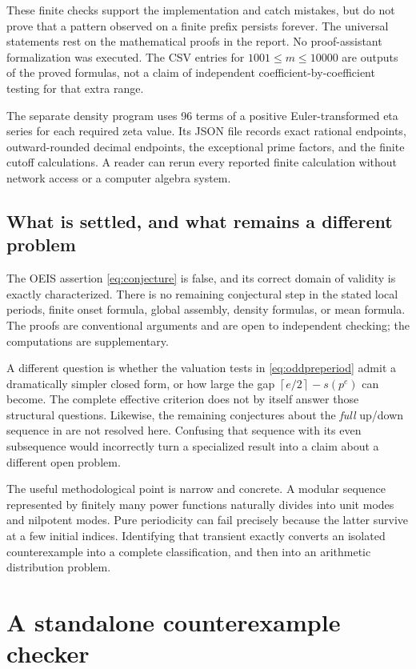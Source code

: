 \documentclass[11pt,a4paper]{article}
\numberwithin{equation}{section}
\theoremstyle{definition}
\newcommand{\ceil}[1]{\left\lceil #1\right\rceil}
\begin{document}
These finite checks support the implementation and catch mistakes, but
do not prove that a pattern observed on a finite prefix persists forever.
The universal statements rest on the mathematical proofs in the report.
No proof-assistant formalization was executed. The CSV entries for
$1001\le m\le10000$ are outputs of the proved formulas, not a claim of
independent coefficient-by-coefficient testing for that extra range.

The separate density program uses 96 terms of a positive Euler-transformed
eta series for each required zeta value. Its JSON file records exact
rational endpoints, outward-rounded decimal endpoints, the exceptional
prime factors, and the finite cutoff calculations. A reader can rerun
every reported finite calculation without network access or a computer
algebra system.

\subsection{What is settled, and what remains a different problem}

The OEIS assertion \eqref{eq:conjecture} is false, and its correct domain
of validity is exactly characterized. There is no remaining conjectural
step in the stated local periods, finite onset formula, global assembly,
density formulas, or mean formula. The proofs are conventional arguments
and are open to independent checking; the computations are supplementary.

A different question is whether the valuation tests in
\eqref{eq:oddpreperiod} admit a dramatically simpler closed form, or how
large the gap $\ceil{e/2}-s(p^e)$ can become. The complete effective
criterion does not by itself answer those structural questions.
Likewise, the remaining conjectures about the \emph{full} up/down
sequence in \cite{gulec} are not resolved here. Confusing that sequence
with its even subsequence would incorrectly turn a specialized result
into a claim about a different open problem.

The useful methodological point is narrow and concrete. A modular
sequence represented by finitely many power functions naturally divides
into unit modes and nilpotent modes. Pure periodicity can fail precisely
because the latter survive at a few initial indices. Identifying that
transient exactly converts an isolated counterexample into a complete
classification, and then into an arithmetic distribution problem.

\clearpage
\appendix
\section{A standalone counterexample checker}
\label{app:checker}
\end{document}
